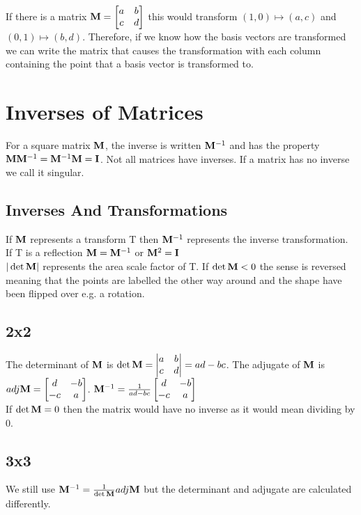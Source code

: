 \documentclass[a4paper,12pt]{article}
\begin{document}
If there is a matrix $\bold{M} = \begin{bmatrix} a & b \\ c & d \end{bmatrix}$ this would transform $(1,0) \mapsto (a, c)$ and $(0,1) \mapsto (b,d)$. Therefore, if we know how the basis vectors are transformed we can write the matrix that causes the transformation with each column containing the point that a basis vector is transformed to. 

\section*{Inverses of Matrices}
For a square matrix $\bold{M}$, the inverse is written $\bold{M}^{-1}$ and has the property $\bold{M}\bold{M}^{-1} = \bold{M}^{-1}\bold{M} = \bold{I}$. Not all matrices have inverses. If a matrix has no inverse we call it singular.
\subsection*{Inverses And Transformations}
If $\bold{M}$ represents a transform T then $\bold{M}^{-1}$ represents the inverse transformation. If T is a reflection $\bold{M} = \bold{M}^{-1}$ or $\bold{M}^2 = \bold{I}$ \\
$|\det \bold{M}|$ represents the area scale factor of T. If $\det \bold{M} < 0$ the sense is reversed meaning that the points are labelled the other way around and the shape have been flipped over e.g. a rotation. 
\subsection*{2x2}
The determinant of $\bold{M}$ is $\det \bold{M} = \begin{vmatrix} a & b \\ c & d \end{vmatrix} = ad-bc$. The adjugate of $\bold{M}$ is $adj \bold{M} = \begin{bmatrix} d & -b \\ -c & a \end{bmatrix}$. $\bold{M}^{-1} = \frac{1}{ad-bc} \begin{bmatrix} d & -b \\ -c & a \end{bmatrix}$ \\
If $\det \bold{M} = 0$ then the matrix would have no inverse as it would mean dividing by 0. 

\subsection*{3x3}
We still use $\bold{M}^{-1} = \frac{1}{\det \bold{M}} adj \bold{M}$ but the determinant and adjugate are calculated differently.
\end{document}

